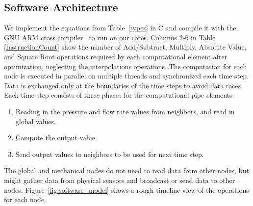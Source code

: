 \subsection{Software Architecture}
\label{sec:software_architecture}
We implement the equations from Table~\ref{types} in C and compile it with the GNU ARM cross compiler~\cite{gnu-arm} to run on our cores. 
Columns 2-6 in Table \ref{InstructionCount} show the number of Add/Subtract, Multiply, Absolute Value, and Square Root operations required by each computational element after optimization, neglecting the interpolations operations.
The computation for each node is executed in parallel on multiple threads and synchronized each time step.
Data is exchanged only at the boundaries of the time steps to avoid data races. 
Each time step consists of three phases for the computational pipe elements:
\begin{enumerate}
  \item Reading in the pressure and flow rate values from neighbors, and read in global values.
  \item Compute the output value.
  \item Send output values to neighbors to be used for next time step.
\end{enumerate}
The global and mechanical nodes do not need to read data from other nodes, but might gather data from physical sensors and broadcast or send data to other nodes.  
Figure~\ref{fig:software_model} shows a rough timeline view of the operations for each node.    

